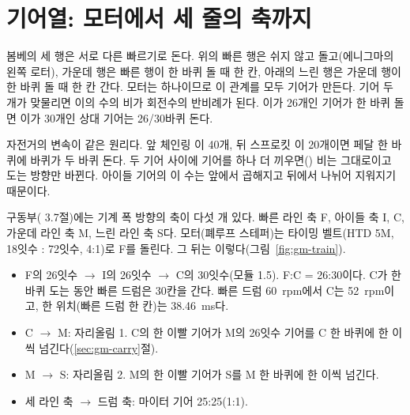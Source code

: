 \section{기어열: 모터에서 세 줄의 축까지}\label{sec:gm-train}

\Why 봄베의 세 행은 서로 다른 빠르기로 돈다. 위의 빠른 행은 쉬지 않고 돌고(에니그마의 왼쪽 로터), 가운데 행은 빠른
행이 한 바퀴 돌 때 한 칸, 아래의 느린 행은 가운데 행이 한 바퀴 돌 때 한 칸 간다. 모터는 하나이므로 이 관계를
모두 기어가 만든다. 기어 두 개가 맞물리면 이의 수의 비가 회전수의 반비례가 된다. 이가 26개인 기어가 한 바퀴 돌면
이가 30개인 상대 기어는 26/30바퀴 돈다.

\General 자전거의 변속이 같은 원리다. 앞 체인링 이 40개, 뒤 스프로킷 이 20개이면 페달 한 바퀴에 바퀴가 두 바퀴
돈다. 두 기어 사이에 기어를 하나 더 끼우면() 비는 그대로이고 도는 방향만 바뀐다.
아이들 기어의 이 수는 앞에서 곱해지고 뒤에서 나뉘어 지워지기 때문이다.

\Ours 구동부( 3.7절)에는 기계 폭 방향의 축이 다섯 개 있다. 빠른 라인 축 F, 아이들 축 I,  C,
가운데 라인 축 M, 느린 라인 축 S다. 모터(폐루프 스테퍼)는 타이밍 벨트(HTD 5M, 18잇수 : 72잇수, 4:1)로 F를 돌린다.
그 뒤는 이렇다(그림~\ref{fig:gm-train}).

\begin{itemize}
\item F의 26잇수 $\to$ I의 26잇수 $\to$ C의 30잇수(모듈 1.5). F:C = 26:30이다. C가 한 바퀴 도는 동안 빠른 드럼은
30칸을 간다. 빠른 드럼 60~rpm에서 C는 52~rpm이고, 한 위치(빠른 드럼 한 칸)는 38.46~ms다.
\item C $\to$ M: 자리올림 1. C의 한 이빨 기어가 M의 26잇수 기어를 C 한 바퀴에 한 이씩 넘긴다(\ref{sec:gm-carry}절).
\item M $\to$ S: 자리올림 2. M의 한 이빨 기어가 S를 M 한 바퀴에 한 이씩 넘긴다.
\item 세 라인 축 $\to$ 드럼 축: 마이터 기어 25:25(1:1).
\end{itemize}


